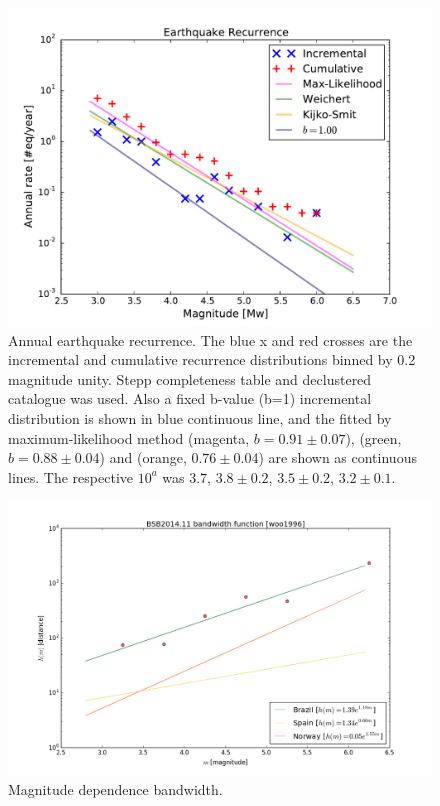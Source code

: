 \documentclass[draft, grl]{agutex}
\begin{document}
\begin{figure}
    \includegraphics[width=.99\linewidth]{z_img_bsb2014_recurrence}
    \caption{Annual earthquake recurrence. The blue x and red crosses are the incremental and cumulative recurrence distributions binned by 0.2 magnitude unity. Stepp completeness table and \citet{bsb_2014} declustered catalogue was used. Also a fixed b-value (b=1) incremental distribution is shown in blue continuous line, and the fitted by maximum-likelihood method (magenta, $b=0.91\pm0.07$), \citet{weichert_1980} (green, $b=0.88\pm0.04$) and \citet{kijko_2012} (orange, $0.76\pm0.04$) are shown as continuous lines. The respective $10^a$ was $3.7$, $3.8\pm0.2$, $3.5\pm0.2$, $3.2\pm0.1$.
    }
    \label{fig_occurrence}
\end{figure}








\begin{figure}
	\includegraphics[width=0.99\linewidth]{z_img_woo_bandwidth}
	\caption{Magnitude dependence bandwidth.}
	\label{fig_woo_bandwidth}
\end{figure}
\end{document}
